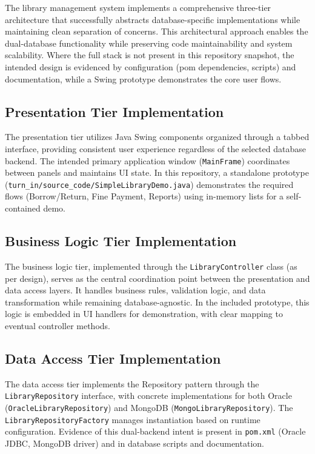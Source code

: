 \documentclass[12pt,a4paper]{article}
\newcommand{\file}[1]{\texttt{#1}}
\newcommand{\class}[1]{\texttt{#1}}
\begin{document}
The library management system implements a comprehensive three-tier architecture that successfully abstracts database-specific implementations while maintaining clean separation of concerns. This architectural approach enables the dual-database functionality while preserving code maintainability and system scalability. Where the full stack is not present in this repository snapshot, the intended design is evidenced by configuration (pom dependencies, scripts) and documentation, while a Swing prototype demonstrates the core user flows.

\subsection{Presentation Tier Implementation}

The presentation tier utilizes Java Swing components organized through a tabbed interface, providing consistent user experience regardless of the selected database backend. The intended primary application window (\class{MainFrame}) coordinates between panels and maintains UI state. In this repository, a standalone prototype (\file{turn\_in/source\_code/SimpleLibraryDemo.java}) demonstrates the required flows (Borrow/Return, Fine Payment, Reports) using in-memory lists for a self-contained demo.

\subsection{Business Logic Tier Implementation}

The business logic tier, implemented through the \class{LibraryController} class (as per design), serves as the central coordination point between the presentation and data access layers. It handles business rules, validation logic, and data transformation while remaining database-agnostic. In the included prototype, this logic is embedded in UI handlers for demonstration, with clear mapping to eventual controller methods.

\subsection{Data Access Tier Implementation}

The data access tier implements the Repository pattern through the \class{LibraryRepository} interface, with concrete implementations for both Oracle (\class{OracleLibraryRepository}) and MongoDB (\class{MongoLibraryRepository}). The \class{LibraryRepositoryFactory} manages instantiation based on runtime configuration. Evidence of this dual-backend intent is present in \file{pom.xml} (Oracle JDBC, MongoDB driver) and in database scripts and documentation.
\end{document}
